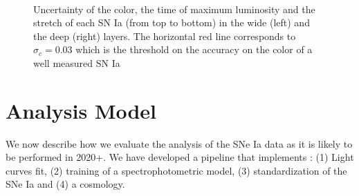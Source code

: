 \documentclass[\docopts]{\docclass}
\begin{document}
\begin{figure}[t]
\begin{center}
\\
\caption{Uncertainty of the color, the time of maximum luminosity and the stretch of each SN Ia (from top to bottom) in the wide (left) and the deep (right) layers. The horizontal red line corresponds to $\sigma_c = 0.03$ which is the threshold on the accuracy on the color of a well measured SN Ia}
\label{fig:sigmas}
\end{center}
\end{figure}


\section{Analysis Model}
\label{sec::analysis_model}

We now describe how we evaluate the analysis of the SNe Ia data as it is likely to be performed in 2020+.
We have developed a pipeline that implements : (1) Light curves fit, (2) training of a spectrophotometric model, (3) standardization of the SNe Ia and (4) a cosmology.
\end{document}
